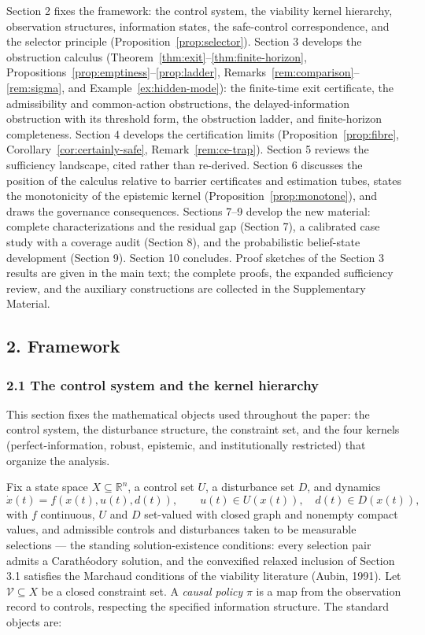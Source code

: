 \documentclass[10pt,twocolumn]{article}
\theoremstyle{definition}
\begin{document}
Section 2 fixes the framework: the control system, the viability kernel
hierarchy, observation structures, information states, the safe-control
correspondence, and the selector principle (Proposition~\ref{prop:selector}). Section 3 develops the obstruction calculus (Theorem~\ref{thm:exit}--\ref{thm:finite-horizon}, Propositions~\ref{prop:emptiness}--\ref{prop:ladder}, Remarks~\ref{rem:comparison}--\ref{rem:sigma}, and Example~\ref{ex:hidden-mode}): the finite-time exit certificate, the admissibility and common-action obstructions, the delayed-information obstruction with its threshold form, the obstruction ladder, and finite-horizon completeness. Section 4 develops the certification limits
(Proposition~\ref{prop:fibre}, Corollary~\ref{cor:certainly-safe}, Remark~\ref{rem:ce-trap}). Section 5 reviews the sufficiency landscape, cited rather than re-derived. Section
6 discusses the position of the calculus relative to barrier
certificates and estimation tubes, states the monotonicity of the
epistemic kernel (Proposition~\ref{prop:monotone}), and draws the governance
consequences. Sections 7--9 develop the new material: complete characterizations and the residual gap (Section 7), a calibrated case study with a coverage audit (Section 8), and the probabilistic belief-state development (Section 9). Section 10 concludes. Proof sketches of the Section 3 results are given in the main text; the complete proofs, the expanded sufficiency review, and the auxiliary constructions are collected in the Supplementary Material.



\subsection{2. Framework}\label{framework}

\subsubsection{2.1 The control system and the kernel
hierarchy}\label{the-control-system-and-the-kernel-hierarchy}

This section fixes the mathematical objects used throughout the paper:
the control system, the disturbance structure, the constraint set, and
the four kernels (perfect-information, robust, epistemic, and
institutionally restricted) that organize the analysis.

Fix a state space \(X \subseteq \mathbb{R}^n\), a control set \(U\), a
disturbance set \(D\), and dynamics
\[\dot x(t) = f(x(t), u(t), d(t)), \qquad u(t) \in U(x(t)), \quad d(t) \in D(x(t)),\]
with \(f\) continuous, \(U\) and \(D\) set-valued with closed graph and
nonempty compact values, and admissible controls and disturbances taken
to be measurable selections --- the standing solution-existence conditions:
every selection pair admits a Carath\'eodory solution, and the
convexified relaxed inclusion of Section 3.1 satisfies the Marchaud
conditions of the viability literature (Aubin, 1991). Let \(\mathcal{V} \subseteq X\) be a closed
constraint set. A \emph{causal policy} \(\pi\) is a map from the
observation record to controls, respecting the specified information structure. The standard objects are:
\end{document}
